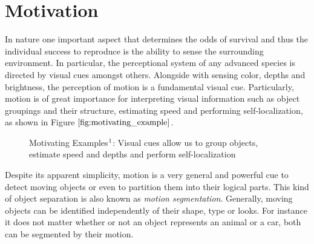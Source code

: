 \section{Motivation}
In nature one important aspect that determines the odds of survival and thus the individual success to reproduce is the ability to sense the surrounding environment. In particular, the perceptional system of any advanced species is directed by visual cues amongst others. Alongside with sensing color, depths and brightness, the perception of motion is a fundamental visual cue. Particularly, motion is of great importance for interpreting visual information such as object groupings and their structure, estimating speed and performing self-localization, as shown in Figure $\ref{fig:motivating_example}$.
\begin{figure}[H]
\begin{center}
\end{center}
\caption[Motivating Example]{Motivating Examples$\footnotemark$: Visual cues allow us to group objects, estimate speed and depths and perform self-localization}
\label{fig:motivating_example}
\end{figure}
Despite its apparent simplicity, motion is a very general and powerful cue to detect moving objects or even to partition them into their logical parts. This kind of object separation is also known as \textit{motion segmentation}. Generally, moving objects can be identified independently of their shape, type or looks. For instance it does not matter whether or not an object represents an animal or a car, both can be segmented by their motion. \\ \\
